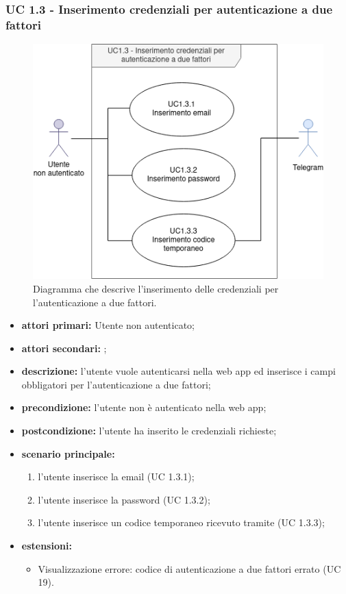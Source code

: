 		\subsubsection{UC 1.3 - Inserimento credenziali per autenticazione a due fattori}

		\begin{figure}[H]
			\centering
			\includegraphics[scale=0.675]{res/images/uc1.3}
			\caption{Diagramma che descrive l'inserimento delle credenziali per l'autenticazione a due fattori.}
		\end{figure}

		\begin{itemize}
			\item \textbf{attori primari:} Utente non autenticato;
			\item \textbf{attori secondari:} ;
			\item \textbf{descrizione:} l'utente vuole autenticarsi nella web app ed inserisce i campi obbligatori per l'autenticazione a due fattori;
			\item \textbf{precondizione:} l'utente non è autenticato nella web app;
			\item \textbf{postcondizione:} l'utente ha inserito le credenziali richieste;
			\item \textbf{scenario principale:}
				\begin{enumerate}
					\item l'utente inserisce la email (UC 1.3.1);
					\item l'utente inserisce la password (UC 1.3.2);
					\item l'utente inserisce un codice temporaneo ricevuto tramite  (UC 1.3.3);
				\end{enumerate}
			\item \textbf{estensioni:}
				\begin{itemize}
					\item Visualizzazione errore: codice di autenticazione a due fattori errato (UC 19).
				\end{itemize}	
		\end{itemize}

